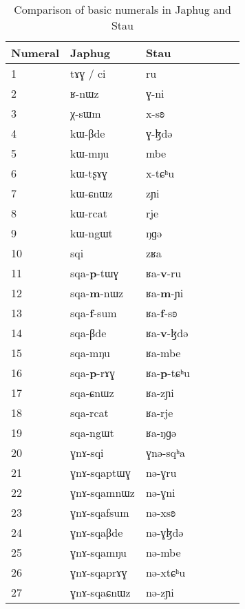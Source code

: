 \documentclass[oldfontcommands,oneside,a4paper,12pt]{article}
\newcommand{\ipa}[1]{{\phon#1}}
\newcommand{\grise}[1]{\cellcolor{lightgray}\textbf{#1}}
\begin{document}
\begin{table}[H]
\caption{Comparison of basic numerals in Japhug and Stau}  \label{tab:num.simple} \centering
\begin{tabular}{lllllll}
\toprule
Numeral & Japhug & Stau \\
\midrule
1	&	\ipa{tɤɣ} / \ipa{ci} &	\ipa{ru}  &	\\
2	&	\ipa{ʁ-nɯz}  &	\ipa{ɣ-ni}  &	\\
3	&	\ipa{χ-sɯm}  &	\ipa{x-sʚ}  &	\\
4	&	\ipa{kɯ-βde}  &	\ipa{ɣ-ɮdə}  &	\\
5	&	\ipa{kɯ-mŋu}  &	\ipa{mbe}  &	\\
6	&	\ipa{kɯ-tʂɤɣ}  &	\ipa{x-tɕʰu}  &	\\
7	&	\ipa{kɯ-ɕnɯz}  &	\ipa{zɲi}  &	\\
8	&	\ipa{kɯ-rcat}  &	\ipa{rje}  &	\\
9	&	\ipa{kɯ-ngɯt}  &	\ipa{ŋɡə}  &	\\
10	&	\ipa{sqi}  &	\ipa{zʁa}  &	\\
\midrule
11	&	\ipa{sqa-\textbf{p}-tɯɣ} \grise &	\ipa{ʁa-\textbf{v}-ru}  \grise&	\\
12	&	\ipa{sqa-\textbf{m}-nɯz} \grise &	\ipa{ʁa-\textbf{m}-ɲi}  \grise&	\\
13	&	\ipa{sqa-\textbf{f}-sum}  \grise&	\ipa{ʁa-\textbf{f}-sʚ} \grise &	\\
14	&	\ipa{sqa-βde}  &	\ipa{ʁa-\textbf{v}-ɮdə}  \grise&	\\
15	&	\ipa{sqa-mŋu}  &	\ipa{ʁa-mbe}  &	\\
16	&	\ipa{sqa-\textbf{p}-rɤɣ}  \grise&	\ipa{ʁa-\textbf{p}-tɕʰu}  \grise&	\\
17	&	\ipa{sqa-ɕnɯz}  &	\ipa{ʁa-zɲi}  &	\\
18	&	\ipa{sqa-rcat}  &	\ipa{ʁa-rje}  &	\\
19	&	\ipa{sqa-ngɯt}  &	\ipa{ʁa-ŋɡə}  &	\\
20	&	\ipa{ɣnɤ-sqi}  &	\ipa{ɣnə-sqʰa}  &	\\
\midrule
21	&	\ipa{ɣnɤ-sqaptɯɣ}  &	\ipa{nə-ɣru}  &	\\	
22	&	\ipa{ɣnɤ-sqamnɯz}  &	\ipa{nə-ɣni}  &	\\	
23	&	\ipa{ɣnɤ-sqafsum}  &	\ipa{nə-xsʚ}  &	\\	
24	&	\ipa{ɣnɤ-sqaβde}  &	\ipa{nə-ɣɮdə}  &	\\	
25	&	\ipa{ɣnɤ-sqamŋu}  &	\ipa{nə-mbe}  &	\\	
26	&	\ipa{ɣnɤ-sqaprɤɣ}  &	\ipa{nə-xtɕʰu}  &	\\	
27	&	\ipa{ɣnɤ-sqaɕnɯz}  &	\ipa{nə-zɲi}  &	\\	

\end{tabular}
\end{table}
\end{document}
